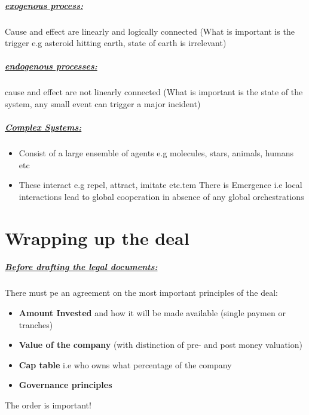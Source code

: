 \documentclass[8pt]{extreport}
\begin{document}
{\paragraph{\underline{exogenous process:}} Cause and effect are linearly and logically connected (What is important is the trigger e.g asteroid hitting earth, state of earth is irrelevant)
\paragraph{\underline{endogenous processes:}} cause and effect are not linearly connected (What is important is the state of the system, any small event can trigger a major incident)
\paragraph{\underline{Complex Systems:}}
\begin{itemize}
\item Consist of a large ensemble of agents e.g molecules, stars, animals, humans etc
\item These interact e.g repel, attract, imitate etc.tem There is Emergence i.e local interactions lead to global cooperation in absence of any global orchestrations
\end{itemize}
\chapter{\Large{Wrapping up the deal}}
\paragraph{\underline{Before drafting the legal documents:}} There must pe an agreement on the most important principles of the deal:
\begin{itemize}
\item \textbf{Amount Invested} and how it will be made available (single paymen or tranches)
\item \textbf{Value of the company} (with distinction of pre- and post money valuation)
\item  \textbf{Cap table} i.e who owns what percentage of the company
\item  \textbf{Governance principles}
\end{itemize}
The order is important!
}
\end{document}
